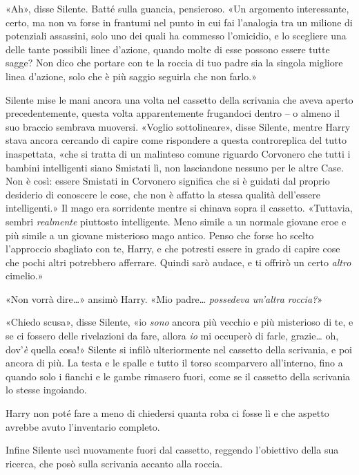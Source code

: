 «Ah», disse Silente. Batté sulla guancia, pensieroso. «Un argomento interessante, certo, ma non va forse in frantumi nel punto in cui fai l’analogia tra un milione di potenziali assassini, solo uno dei quali ha commesso l’omicidio, e lo scegliere una delle tante possibili linee d’azione, quando molte di esse possono essere tutte sagge? Non dico che portare con te la roccia di tuo padre sia la singola migliore linea d’azione, solo che è più saggio seguirla che non farlo.»

Silente mise le mani ancora una volta nel cassetto della scrivania che aveva aperto precedentemente, questa volta apparentemente frugandoci dentro – o almeno il suo braccio sembrava muoversi. «Voglio sottolineare», disse Silente, mentre Harry stava ancora cercando di capire come rispondere a questa controreplica del tutto inaspettata, «che si tratta di un malinteso comune riguardo Corvonero che tutti i bambini intelligenti siano Smistati lì, non lasciandone nessuno per le altre Case. Non è così: essere Smistati in Corvonero significa che si è guidati dal proprio desiderio di conoscere le cose, che non è affatto la stessa qualità dell’essere intelligenti.» Il mago era sorridente mentre si chinava sopra il cassetto. «Tuttavia, sembri \textit{realmente} piuttosto intelligente. Meno simile a un normale giovane eroe e più simile a un giovane misterioso mago antico. Penso che forse ho scelto l’approccio sbagliato con te, Harry, e che potresti essere in grado di capire cose che pochi altri potrebbero afferrare. Quindi sarò audace, e ti offrirò un certo \textit{altro} cimelio.»

«Non vorrà dire…» ansimò Harry. «Mio padre… \textit{possedeva un’altra roccia?}»

«Chiedo scusa», disse Silente, «io \textit{sono} ancora più vecchio e più misterioso di te, e se ci fossero delle rivelazioni da fare, allora \textit{io} mi occuperò di farle, grazie… oh, dov’\textit{è} quella cosa!» Silente si infilò ulteriormente nel cassetto della scrivania, e poi ancora di più. La testa e le spalle e tutto il torso scomparvero all’interno, fino a quando solo i fianchi e le gambe rimasero fuori, come se il cassetto della scrivania lo stesse ingoiando.

Harry non poté fare a meno di chiedersi quanta roba ci fosse lì e che aspetto avrebbe avuto l’inventario completo.

Infine Silente uscì nuovamente fuori dal cassetto, reggendo l’obiettivo della sua ricerca, che posò sulla scrivania accanto alla roccia.


